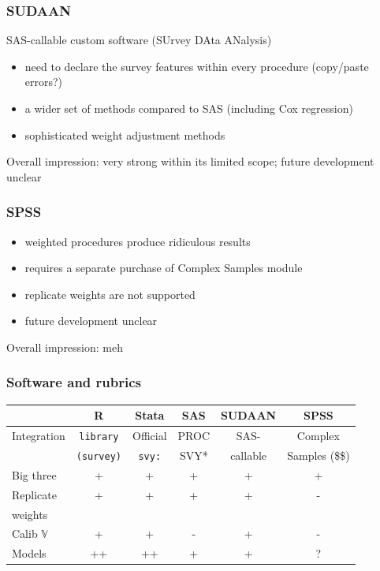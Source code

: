 \documentclass[handout]{beamer}
\begin{document}
\begin{frame}\frametitle{SUDAAN}


SAS-callable custom software (SUrvey DAta ANalysis)

\begin{itemize}
    \item need to declare the survey features within every procedure (copy/paste errors?)
    \item a wider set of methods compared to SAS (including Cox regression)
    \item sophisticated weight adjustment methods
\end{itemize}

\bigskip

Overall impression: very strong within its limited scope; future development unclear

\end{frame}

\begin{frame}\frametitle{SPSS}


\begin{itemize}
    \item weighted procedures produce ridiculous results
    \item requires a separate purchase of Complex Samples module
    \item replicate weights are not supported
    \item future development unclear
\end{itemize}

\vspace{1in}

Overall impression: meh

\end{frame}

\begin{frame}\frametitle{Software and rubrics}

\noindent
\begin{tabular}{l|ccccc}
    & R
        & Stata
            & SAS
                & SUDAAN
                    & SPSS \\
\hline
Integration
    & \texttt{library}
        & Official
            & PROC
                & SAS-
                    & Complex \\
    & \texttt{(survey)}
        & \texttt{svy:}
            & SVY*
                & callable
                    & Samples (\$\$) \\
Big three & + & + & + & + & + \\
Replicate & + & + & + & + & - \\
weights & \\
Calib $\mathbb{V}$
    & + & + & - & + & - \\
Models & ++ & ++ & + & + & ? \\
\end{tabular}

\end{frame}
\end{document}
